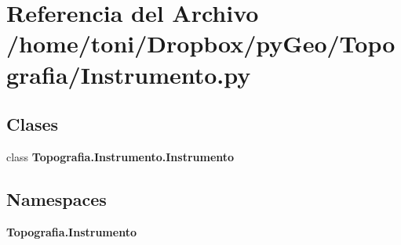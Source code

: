 \section{Referencia del Archivo /home/toni/\-Dropbox/py\-Geo/\-Topografia/\-Instrumento.py}
\label{Instrumento_8py}
\subsection*{Clases}
\begin{DoxyCompactItemize}
\item 
class {\bf Topografia.\-Instrumento.\-Instrumento}
\end{DoxyCompactItemize}
\subsection*{Namespaces}
\begin{DoxyCompactItemize}
\item 
{\bf Topografia.\-Instrumento}
\end{DoxyCompactItemize}
